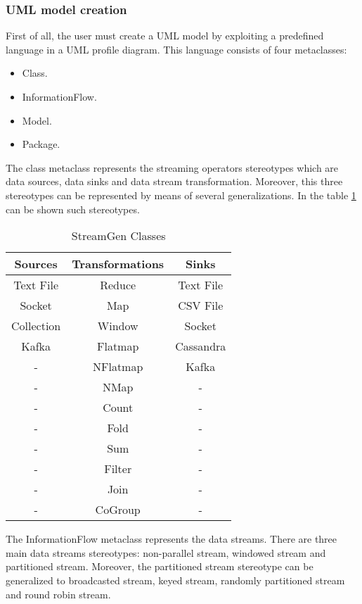 \subsubsection*{UML model creation}

First of all, the user must create a UML model by exploiting a predefined language in a UML profile diagram. This language consists of four metaclasses:

\begin{itemize}
\item Class.
\item InformationFlow.
\item Model.
\item Package.
\end{itemize}

The class metaclass represents the streaming operators stereotypes which are data sources, data sinks and data stream transformation. Moreover, this three stereotypes can be represented by means of several generalizations. In the table \ref{StreamGen Classes} can be shown such stereotypes.

\begin{table}[h!]
\centering
	\begin{tabular}{||c|c|c||} 
	\hline\hline
	Sources & Transformations & Sinks \\ 
	\hline\hline
	Text File & Reduce & Text File \\ 
	\hline
	Socket & Map & CSV File \\ 
	\hline
	Collection & Window & Socket \\ 
	\hline
	Kafka & Flatmap & Cassandra \\ 
	\hline
	 - & NFlatmap & Kafka \\
	\hline
	 - & NMap & - \\
	\hline
	 - & Count & - \\
	\hline
	 - & Fold & - \\
	\hline
	 - & Sum & - \\
	\hline
	 - & Filter & - \\
	\hline
	 - & Join & - \\
	\hline
	 - & CoGroup & - \\
	\hline\hline
	\end{tabular}
\caption{StreamGen Classes}
\label{StreamGen Classes}
\end{table}

The InformationFlow metaclass represents the data streams. There are three main data streams stereotypes: non-parallel stream, windowed stream and partitioned stream. Moreover, the partitioned stream stereotype can be generalized to broadcasted stream, keyed stream, randomly partitioned stream and round robin stream.

